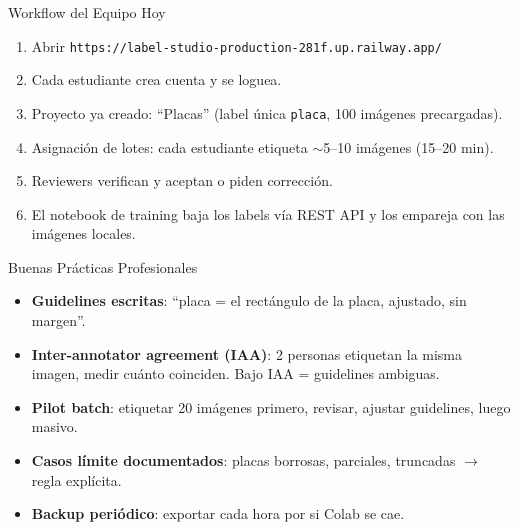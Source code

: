 \documentclass[aspectratio=169, 11pt]{beamer}
\begin{document}
\begin{frame}[shrink]{Workflow del Equipo Hoy}
  \vspace{8pt}
  {\footnotesize
  \begin{enumerate}\setlength{\itemsep}{6pt}
    \item[{\color{arcaRed}\bfseries 1.}]
      Abrir
      \texttt{\scriptsize https://label-studio-production-281f.up.railway.app/}
    \item[{\color{arcaRed}\bfseries 2.}]
      Cada estudiante crea cuenta y se loguea.
    \item[{\color{arcaRed}\bfseries 3.}]
      Proyecto ya creado: ``Placas'' (label \'unica \texttt{placa},
      100 im\'agenes precargadas).
    \item[{\color{arcaRed}\bfseries 4.}]
      Asignaci\'on de lotes: cada estudiante etiqueta $\sim$5--10
      im\'agenes (15--20 min).
    \item[{\color{arcaRed}\bfseries 5.}]
      Reviewers verifican y aceptan o piden correcci\'on.
    \item[{\color{codeGreen}\bfseries 6.}]
      El notebook de training baja los labels v\'ia REST API y los
      empareja con las im\'agenes locales.
  \end{enumerate}
  }
\end{frame}

\begin{frame}[shrink]{Buenas Pr\'acticas Profesionales}
  \vspace{8pt}
  {\footnotesize
  \begin{itemize}\setlength{\itemsep}{6pt}
    \item[{\color{arcaRed}\scriptsize\faArrowRight}]
      \textbf{Guidelines escritas}: ``placa = el rect\'angulo de la placa,
      ajustado, sin margen''.
    \item[{\color{arcaRed}\scriptsize\faArrowRight}]
      \textbf{Inter-annotator agreement (IAA)}: 2 personas etiquetan la
      misma imagen, medir cu\'anto coinciden. Bajo IAA = guidelines ambiguas.
    \item[{\color{arcaRed}\scriptsize\faArrowRight}]
      \textbf{Pilot batch}: etiquetar 20 im\'agenes primero, revisar,
      ajustar guidelines, luego masivo.
    \item[{\color{arcaRed}\scriptsize\faArrowRight}]
      \textbf{Casos l\'imite documentados}: placas borrosas, parciales,
      truncadas $\to$ regla expl\'icita.
    \item[{\color{codeGreen}\scriptsize\faArrowRight}]
      \textbf{Backup peri\'odico}: exportar cada hora por si Colab se cae.
  \end{itemize}
  }
\end{frame}
\end{document}
